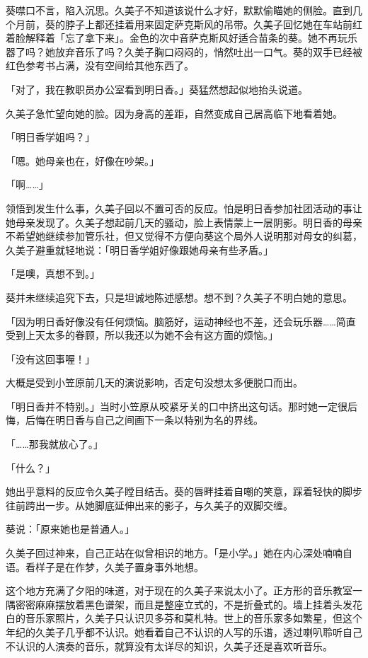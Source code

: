 \documentclass[UTF8]{ctexart}
\begin{document}
    葵噤口不言，陷入沉思。久美子不知道该说什么才好，默默偷瞄她的侧脸。直到几个月前，葵的脖子上都还挂着用来固定萨克斯风的吊带。久美子回忆她在车站前红着脸解释着「忘了拿下来」。金色的次中音萨克斯风好适合苗条的葵。她不再玩乐器了吗？她放弃音乐了吗？久美子胸口闷闷的，悄然吐出一口气。葵的双手已经被红色参考书占满，没有空间给其他东西了。 

    「对了，我在教职员办公室看到明日香。」葵猛然想起似地抬头说道。 

    久美子急忙望向她的脸。因为身高的差距，自然变成自己居高临下地看着她。 

    「明日香学姐吗？」 

    「嗯。她母亲也在，好像在吵架。」 

    「啊……」 

    领悟到发生什么事，久美子回以不置可否的反应。怕是明日香参加社团活动的事让她母亲发现了。久美子想起前几天的骚动，脸上表情蒙上一层阴影。明日香的母亲不希望她继续参加管乐社，但又觉得不方便向葵这个局外人说明那对母女的纠葛，久美子避重就轻地说：「明日香学姐好像跟她母亲有些矛盾。」 

    「是噢，真想不到。」 

    葵并未继续追究下去，只是坦诚地陈述感想。想不到？久美子不明白她的意思。 

    「因为明日香好像没有任何烦恼。脑筋好，运动神经也不差，还会玩乐器……简直受到上天太多的眷顾，所以我还以为她不会有这方面的烦恼。」 

    「没有这回事喔！」 

    大概是受到小笠原前几天的演说影响，否定句没想太多便脱口而出。 

    「明日香并不特别。」当时小笠原从咬紧牙关的口中挤出这句话。那时她一定很后悔，后悔在明日香与自己之间画下一条以特别为名的界线。 

    「……那我就放心了。」 

    「什么？」 

    她出乎意料的反应令久美子瞠目结舌。葵的唇畔挂着自嘲的笑意，踩着轻快的脚步往前跨出一步。从她脚底延伸出来的影子，与久美子的双脚交缠。 

    葵说：「原来她也是普通人。」 

    久美子回过神来，自己正站在似曾相识的地方。「是小学。」她在内心深处喃喃自语。看样子是在作梦，久美子置身事外地想。 

    这个地方充满了夕阳的味道，对于现在的久美子来说太小了。正方形的音乐教室一隅密密麻麻摆放着黑色谱架，而且是整座立式的，不是折叠式的。墙上挂着头发花白的音乐家照片，久美子只认识贝多芬和莫札特。世上的音乐家多如繁星，但这个年纪的久美子几乎都不认识。她看着自己不认识的人写的乐谱，透过喇叭聆听自己不认识的人演奏的音乐，就算没有太详尽的知识，久美子还是喜欢听音乐。 
\end{document}
